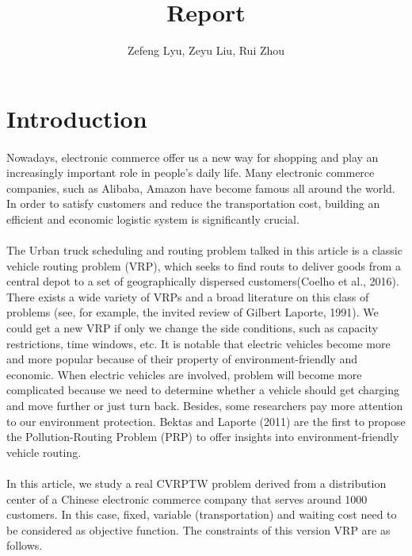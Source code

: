 \documentclass[12pt]{article}
\title{Report}
\author{Zefeng Lyu, Zeyu Liu, Rui Zhou}
\date{}
\numberwithin{equation}{section}
\begin{document}
\maketitle

\section{Introduction}

	\paragraph{}Nowadays, electronic commerce offer us a new way for shopping and play an increasingly important role in people’s daily life. Many electronic commerce companies, such as Alibaba, Amazon have become famous all around the world. In order to satisfy customers and reduce the transportation cost, building an efficient and economic logistic system is significantly crucial. 
	
	\paragraph{}The Urban truck scheduling and routing problem talked in this article is a classic vehicle routing problem (VRP), which seeks to find routs to deliver goods from a central depot to a set of geographically dispersed customers(Coelho et al., 2016). There exists a wide variety of VRPs and a broad literature on this class of problems (see, for example, the invited review of Gilbert Laporte, 1991). We could get a new VRP if only we change the side conditions, such as capacity restrictions, time windows, etc. It is notable that electric vehicles become more and more popular because of their property of environment-friendly and economic. When electric vehicles are involved, problem will become more complicated because we need to determine whether a vehicle should get charging and move further or just turn back. Besides, some researchers pay more attention to our environment protection. Bektas and Laporte (2011) are the first to propose the Pollution-Routing Problem (PRP) to offer insights into environment-friendly vehicle routing. 
	
	\paragraph{}In this article, we study a real CVRPTW problem derived from a distribution center of a Chinese electronic commerce company that serves around 1000 customers. In this case, fixed, variable (transportation) and waiting cost need to be considered as objective function. The constraints of this version VRP are as follows. 
	
\end{document}
